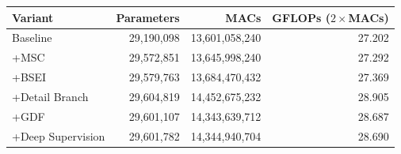 \begin{tabular}{lrrr}
\hline
Variant & Parameters & MACs & GFLOPs ($2\times$MACs) \\
\hline
Baseline & 29,190,098 & 13,601,058,240 & 27.202 \\
+MSC & 29,572,851 & 13,645,998,240 & 27.292 \\
+BSEI & 29,579,763 & 13,684,470,432 & 27.369 \\
+Detail Branch & 29,604,819 & 14,452,675,232 & 28.905 \\
+GDF & 29,601,107 & 14,343,639,712 & 28.687 \\
+Deep Supervision & 29,601,782 & 14,344,940,704 & 28.690 \\
\hline
\end{tabular}
